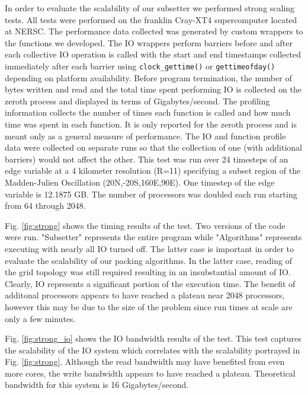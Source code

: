 In order to evaluate the scalability of our subsetter we performed strong
scaling tests.  All tests were performed on the franklin Cray-XT4
supercomputer\cite{franklin} located at NERSC\cite{NERSC}.  The performance
data collected was generated by custom wrappers to the functions we developed.
The IO wrappers perform barriers before and after each collective IO operation
is called with the start and end timestamps collected immediately after each
barrier using \verb=clock_gettime()= or \verb=gettimeofday()= depending on
platform availability.  Before program termination, the number of bytes
written and read and the total time spent performing IO is collected on the
zeroth process and displayed in terms of Gigabytes/second.  The profiling
information collects the number of times each function is called and how much
time was spent in each function.  It is only reported for the zeroth process
and is meant only as a general measure of performance.  The IO and function
profile data were collected on separate runs so that the collection of one
(with additional barriers) would not affect the other.  This test was run over
24 timesteps of an edge variable at a 4 kilometer resolution (R=11) specifying
a subset region of the Madden-Julien Oscillation\cite{MJO}
(20N,-20S,160E,90E).  One timestep of the edge variable is 12.1875 GB.  The
number of processors was doubled each run starting from 64 through 2048.

Fig. \ref{fig:strong} shows the timing results of the test.  Two versions of
the code were run.  "Subsetter" represents the entire program while
"Algorithms" represents executing with nearly all IO turned off.  The latter
case is important in order to evaluate the scalability of our packing
algorithms.  In the latter case, reading of the grid topology was still
required resulting in an insubstantial amount of IO.  Clearly, IO represents a
significant portion of the execution time.  The benefit of additonal
processors appears to have reached a plateau near 2048 processors, however
this may be due to the size of the problem since run times at scale are only
a few minutes.

Fig. \ref{fig:strong_io} shows the IO bandwidth results of the test.  This
test captures the scalability of the IO system which correlates with the
scalability portrayed in Fig. \ref{fig:strong}.  Although the read bandwidth
may have benefited from even more cores, the write bandwidth appears to have
reached a plateau.  Theoretical bandwidth for this system is 16
Gigabytes/second.

